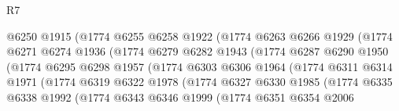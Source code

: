 \begin{lexlean}{R7}
\begin{coremodule}
                              @6250
                              @1915
                              (@1774
                                @6255
                                @6258
                                @1922
                                (@1774
                                  @6263
                                  @6266
                                  @1929
                                  (@1774
                                    @6271
                                    @6274
                                    @1936
                                    (@1774
                                      @6279
                                      @6282
                                      @1943
                                      (@1774
                                        @6287
                                        @6290
                                        @1950
                                        (@1774
                                          @6295
                                          @6298
                                          @1957
                                          (@1774
                                            @6303
                                            @6306
                                            @1964
                                            (@1774
                                              @6311
                                              @6314
                                              @1971
                                              (@1774
                                                @6319
                                                @6322
                                                @1978
                                                (@1774
                                                  @6327
                                                  @6330
                                                  @1985
                                                  (@1774
                                                    @6335
                                                    @6338
                                                    @1992
                                                    (@1774
                                                      @6343
                                                      @6346
                                                      @1999
                                                      (@1774
                                                        @6351
                                                        @6354
                                                        @2006

\end{coremodule}
\end{lexlean}
